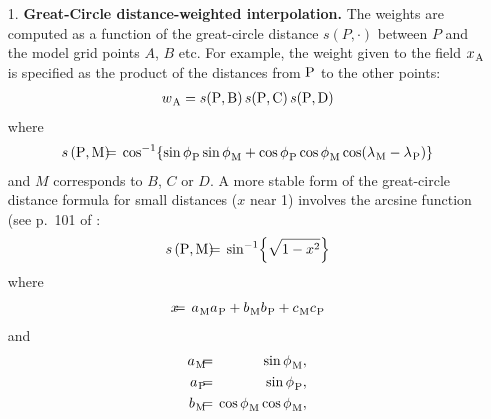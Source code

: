 \documentclass[../main/NEMO_manual]{subfiles}
\begin{document}
\begin{enumerate}

\item[1.] {\bf Great-Circle distance-weighted interpolation.}
  The weights are computed as a function of the great-circle distance $s(P, \cdot)$ between $P$ and
  the model grid points $A$, $B$ etc.
  For example, the weight given to the field ${x_{}}_{\rm A}$ is specified as the product of the distances
  from ${\rm P}$ to the other points:
  \begin{align*}
    {w_{}}_{\rm A} = s({\rm P}, {\rm B}) \, s({\rm P}, {\rm C}) \, s({\rm P}, {\rm D})
  \end{align*}
  where 
  \begin{align*}
    s\left ({\rm P}, {\rm M} \right ) 
     & \hspace{-2mm} = \hspace{-2mm} & 
      \cos^{-1} \! \left\{ 
               \sin {\phi_{}}_{\rm P} \sin {\phi_{}}_{\rm M}
             + \cos {\phi_{}}_{\rm P} \cos {\phi_{}}_{\rm M} 
               \cos ({\lambda_{}}_{\rm M} - {\lambda_{}}_{\rm P}) 
                   \right\}
   \end{align*}
   and $M$ corresponds to $B$, $C$ or $D$.
   A more stable form of the great-circle distance formula for small distances ($x$ near 1)
   involves the arcsine function (\eg see p.~101 of \citet{Daley_Barker_Bk01}:
   \begin{align*}
     s\left( {\rm P}, {\rm M} \right) & \hspace{-2mm} = \hspace{-2mm} & \sin^{-1} \! \left\{ \sqrt{ 1 - x^2 } \right\}
   \end{align*}
   where
   \begin{align*}
     x & \hspace{-2mm} = \hspace{-2mm} &
                                         {a_{}}_{\rm M} {a_{}}_{\rm P} + {b_{}}_{\rm M} {b_{}}_{\rm P} + {c_{}}_{\rm M} {c_{}}_{\rm P}
   \end{align*}
   and 
   \begin{align*}
      {a_{}}_{\rm M} & \hspace{-2mm} = \hspace{-2mm} & \sin {\phi_{}}_{\rm M}, \\
      {a_{}}_{\rm P} & \hspace{-2mm} = \hspace{-2mm} & \sin {\phi_{}}_{\rm P}, \\
      {b_{}}_{\rm M} & \hspace{-2mm} = \hspace{-2mm} & \cos {\phi_{}}_{\rm M} \cos {\phi_{}}_{\rm M}, \\

\end{align*}
\end{enumerate}
\end{document}
